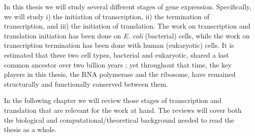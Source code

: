 In this thesis we will study several different stages of gene expression.
Specifically, we will study i) the initiation of transcription, ii) the
termination of transcription, and iii) the initiation of translation. The work
on transcription and translation initiation has been done on \textit{E. coli}
(bacterial) cells, while the work on transcription termination has been done
with human (eukaryotic) cells. It is estimated that these two cell types,
bacterial and eukaryotic, shared a last common ancestor over two billion years
\cite{vellai_origin_1999}; yet throughout that time, the key players in this
thesis, the RNA polymerase and the ribosome, have remained structurally and
functionally conserved between them.

In the following chapter we will review those stages of transcription and
translation that are relevant for the work at hand. The reviews will cover both
the biological and computational/theoretical background needed to read the
thesis as a whole.
